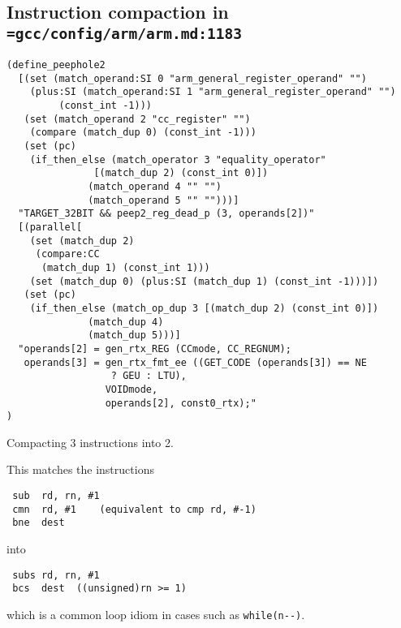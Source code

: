 \documentclass[11pt]{article}
\begin{document}
\subsection{Instruction compaction in \texttt{=gcc/config/arm/arm.md:1183}}
\begin{listing}
\begin{verbatim}
(define_peephole2
  [(set (match_operand:SI 0 "arm_general_register_operand" "")
	(plus:SI (match_operand:SI 1 "arm_general_register_operand" "")
		 (const_int -1)))
   (set (match_operand 2 "cc_register" "")
	(compare (match_dup 0) (const_int -1)))
   (set (pc)
	(if_then_else (match_operator 3 "equality_operator"
		       [(match_dup 2) (const_int 0)])
		      (match_operand 4 "" "")
		      (match_operand 5 "" "")))]
  "TARGET_32BIT && peep2_reg_dead_p (3, operands[2])"
  [(parallel[
    (set (match_dup 2)
	 (compare:CC
	  (match_dup 1) (const_int 1)))
    (set (match_dup 0) (plus:SI (match_dup 1) (const_int -1)))])
   (set (pc)
	(if_then_else (match_op_dup 3 [(match_dup 2) (const_int 0)])
		      (match_dup 4)
		      (match_dup 5)))]
  "operands[2] = gen_rtx_REG (CCmode, CC_REGNUM);
   operands[3] = gen_rtx_fmt_ee ((GET_CODE (operands[3]) == NE
				  ? GEU : LTU),
				 VOIDmode,
				 operands[2], const0_rtx);"
)
\end{verbatim}
\caption{Compacting 3 instructions into 2.}
\end{listing}

This matches the instructions
\begin{listing}
\begin{verbatim}
 sub  rd, rn, #1
 cmn  rd, #1	(equivalent to cmp rd, #-1)
 bne  dest
\end{verbatim}
\end{listing}

into

\begin{listing}
\begin{verbatim}
 subs rd, rn, #1
 bcs  dest	((unsigned)rn >= 1)
\end{verbatim}
\end{listing}

which is a common loop idiom in cases such as \verb|while(n--)|.
\end{document}
